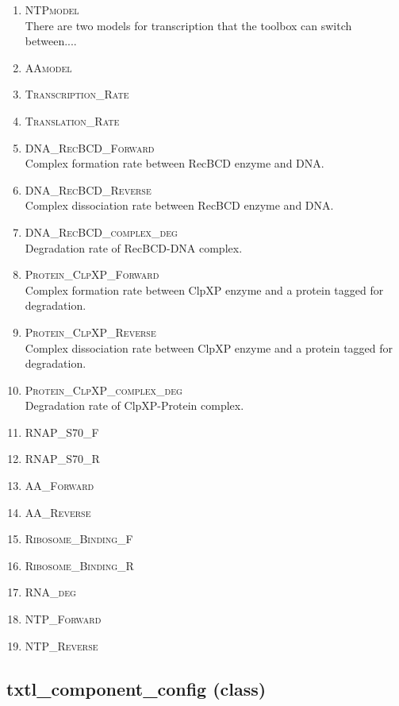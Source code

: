 \documentclass[english]{report}
\begin{document}
			\begin{enumerate}
			\item \textsc{NTPmodel} \\
			There are two models for transcription that the toolbox can switch between....
        	\item \textsc{AAmodel}
        	\item \textsc{Transcription\_Rate}
        	\item \textsc{Translation\_Rate}
        	\item \textsc{DNA\_RecBCD\_Forward} \\
        	Complex formation rate between RecBCD enzyme and DNA.        	
        	\item \textsc{DNA\_RecBCD\_Reverse} \\
        	Complex dissociation rate between RecBCD enzyme and DNA. 
        	\item \textsc{DNA\_RecBCD\_complex\_deg} \\
        	Degradation rate of RecBCD-DNA complex.
        	\item \textsc{Protein\_ClpXP\_Forward} \\
        	Complex formation rate between ClpXP enzyme and a protein tagged for degradation.
        	\item \textsc{Protein\_ClpXP\_Reverse} \\
        	Complex dissociation rate between ClpXP enzyme and a protein tagged for degradation.
        	\item \textsc{Protein\_ClpXP\_complex\_deg} \\
        	Degradation rate of ClpXP-Protein complex.
        	\item \textsc{RNAP\_S70\_F}
        	\item \textsc{RNAP\_S70\_R}
        	\item \textsc{AA\_Forward}
        	\item \textsc{AA\_Reverse}
        	\item \textsc{Ribosome\_Binding\_F}
        	\item \textsc{Ribosome\_Binding\_R}
        	\item \textsc{RNA\_deg}
        	\item \textsc{NTP\_Forward}
        	\item \textsc{NTP\_Reverse}
			\end{enumerate}		
		\subsection*{txtl\_component\_config (class)}		
\end{document}
